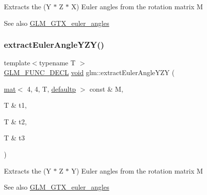 Extracts the (Y $\ast$ Z $\ast$ X) Euler angles from the rotation matrix M \begin{DoxySeeAlso}{See also}
\hyperlink{group__gtx__euler__angles}{G\+L\+M\+\_\+\+G\+T\+X\+\_\+euler\+\_\+angles} 
\end{DoxySeeAlso}
\mbox{\label{group__gtx__euler__angles_ga11dad972c109e4bf8694c915017c44a6}} 
\subsubsection{\texorpdfstring{extract\+Euler\+Angle\+Y\+Z\+Y()}{extractEulerAngleYZY()}}
{\footnotesize\ttfamily template$<$typename T $>$ \\
\hyperlink{setup_8hpp_ab2d052de21a70539923e9bcbf6e83a51}{G\+L\+M\+\_\+\+F\+U\+N\+C\+\_\+\+D\+E\+CL} \hyperlink{_s_d_l__opengles2__gl2ext_8h_ae5d8fa23ad07c48bb609509eae494c95}{void} glm\+::extract\+Euler\+Angle\+Y\+ZY (\begin{DoxyParamCaption}\item[{\hyperlink{structglm_1_1mat}{mat}$<$ 4, 4, T, \hyperlink{namespaceglm_a36ed105b07c7746804d7fdc7cc90ff25a9d21ccd8b5a009ec7eb7677befc3bf51}{defaultp} $>$ const \&}]{M,  }\item[{T \&}]{t1,  }\item[{T \&}]{t2,  }\item[{T \&}]{t3 }\end{DoxyParamCaption})}

Extracts the (Y $\ast$ Z $\ast$ Y) Euler angles from the rotation matrix M \begin{DoxySeeAlso}{See also}
\hyperlink{group__gtx__euler__angles}{G\+L\+M\+\_\+\+G\+T\+X\+\_\+euler\+\_\+angles} 
\end{DoxySeeAlso}
\mbox{\label{group__gtx__euler__angles_ga81fbbca2ba0c778b9662d5355b4e2363}} 
